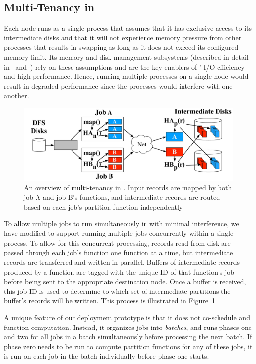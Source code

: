 \subsection{Multi-Tenancy in \themis}
\label{sec:multi-tenancy}

Each \themis node runs as a single process that assumes that it has exclusive
access to its intermediate disks and that it will not experience
memory pressure from other processes that results in swapping as long as it
does not exceed its configured memory limit. Its memory and disk management
subsystems (described in detail in~\cite{themis} and~\cite{tritonsort}) rely on
these assumptions and are the key enablers of \themis' I/O-efficiency and high
performance. Hence, running multiple \themis processes on a single node would
result in degraded performance since the processes would interfere with one
another.

\begin{figure}
  \centering
  \includegraphics[width=\columnwidth]{fault_tolerance/figures/multi_tenancy}
  \caption{\label{fig:multi_tenancy} An overview of multi-tenancy in
\themis. Input records are mapped by both job A and job B's \map functions,
and intermediate records are routed based on each job's partition function independently.}
\end{figure}

To allow multiple jobs to run simultaneously in \themis with minimal
interference, we have modified \themis to support running multiple jobs
concurrently within a single process. To allow for this concurrent processing,
records read from disk are passed through each job's \map function one function
at a time, but intermediate records are transferred and written in
parallel. Buffers of intermediate records produced by a \map function are
tagged with the unique ID of that \map function's job before being sent to the
appropriate destination node. Once a buffer is received, this job ID is used to
determine to which set of intermediate partitions the buffer's records will be
written. This process is illustrated in Figure~\ref{fig:multi_tenancy}

A unique feature of our deployment prototype is that it does not co-schedule
\map and \reduce function computation. Instead, it organizes jobs into
\emph{batches}, and runs phases one and two for all jobs in a batch
simultaneously before processing the next batch. If phase zero needs to be run
to compute partition functions for any of these jobs, it is run on each job in
the batch individually before phase one starts.
